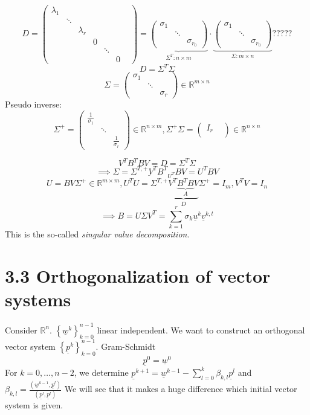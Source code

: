 \documentclass{article}
\newcommand{\set}[1]{\left\{#1\right\}}
\begin{document}
\[
  D = \begin{pmatrix} \lambda_1 & & & & & \\ & \ddots & & & & \\ & & \lambda_r & & & \\ & & & 0 & & \\ & & & & \ddots & & \\ & & & & & 0 \end{pmatrix}
  = \underbrace{\begin{pmatrix} \sigma_1 & & \\ & \ddots & \\ & & \sigma_{r_0} \end{pmatrix}}_{\Sigma^T: n \times m} \cdot
  \underbrace{\begin{pmatrix} \sigma_1 & & \\ & \ddots & \\ & & \sigma_{r_0} \end{pmatrix}}_{\Sigma: m \times n} ?????
\]
\[ D = \Sigma^T \Sigma \]
\[ \Sigma = \begin{pmatrix} \sigma_1 & & \\ & \ddots & \\ & & \sigma_r \end{pmatrix} \in \mathbb R^{m\times n} \]
Pseudo inverse:
\[ \Sigma^+ = \begin{pmatrix} \frac{1}{\sigma_1} & & \\ & \ddots & \\ & & \frac{1}{\sigma_r} \end{pmatrix} \in \mathbb R^{n\times m}, \Sigma^+ \Sigma = \begin{pmatrix} I_r & \\ & \end{pmatrix} \in \mathbb R^{n \times n} \]

\[ V^T B^T B V = D = \Sigma^T \Sigma \]
\[ \implies \Sigma = \underline{\Sigma^{T,+} V^T B^T}_{U^T} B V = U^T B V \]
\[ U = BV\Sigma^+ \in \mathbb R^{m\times m}, U^T U = \Sigma^{T,+} \underbrace{V^T \underbrace{B^T B}_{A} V}_{D} \Sigma^+ = I_m, V^T V = I_n \]
\[ \implies B = U \Sigma V^T = \sum_{k=1}^r \sigma_k \underline{u}^k \underline{v}^{k,t} \]
This is the so-called \emph{singular value decomposition}.

\section{3.3 Orthogonalization of vector systems}

Consider $\mathbb R^n$. $\set{\underline{w}^k}_{k=0}^{n-1}$ linear independent.
We want to construct an orthogonal vector system $\set{\underline{p}^k}_{k=0}^{n-1}$.
Gram-Schmidt
\[ \underline{p}^0 = \underline{w}^0 \]
For $k=0,\ldots,n-2$, we determine $\underline{p}^{k+1} = \underline{w}^{k-1} - \sum_{l=0}^k \beta_{k,l} \underline{p}^l$ and $\beta_{k,l} = \frac{(\underline{w}^{k-1}, \underline{p}^l)}{(\underline{p}^l, \underline{p}^l)}$
We will see that it makes a huge difference which initial vector system is given.
\end{document}
